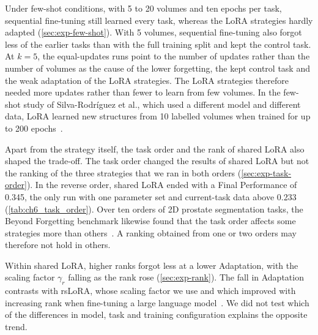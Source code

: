 Under few-shot conditions, with 5 to 20 volumes and ten epochs per task, sequential fine-tuning still learned every task, whereas the LoRA strategies hardly adapted (\cref{sec:exp-few-shot}).
With 5 volumes, sequential fine-tuning also forgot less of the earlier tasks than with the full training split and kept the control task.
At $k = 5$, the equal-updates runs point to the number of updates rather than the number of volumes as the cause of the lower forgetting, the kept control task and the weak adaptation of the LoRA strategies.
The LoRA strategies therefore needed more updates rather than fewer to learn from few volumes.
In the few-shot study of Silva-Rodríguez et al., which used a different model and different data, LoRA learned new structures from 10 labelled volumes when trained for up to 200 epochs~\cite[Sec.~4.3.2]{silvarodriguez2023fseft}.

Apart from the strategy itself, the task order and the rank of shared LoRA also shaped the trade-off.
The task order changed the results of shared LoRA but not the ranking of the three strategies that we ran in both orders (\cref{sec:exp-task-order}).
In the reverse order, shared LoRA ended with a Final Performance of 0.345, the only run with one parameter set and current-task data above 0.233 (\cref{tab:ch6_task_order}).
Over ten orders of 2D prostate segmentation tasks, the Beyond Forgetting benchmark likewise found that the task order affects some strategies more than others~\cite[Sec.~4.4]{wang2026beyondforgetting}.
A ranking obtained from one or two orders may therefore not hold in others.

Within shared LoRA, higher ranks forgot less at a lower Adaptation, with the scaling factor $\gamma_r$ falling as the rank rose (\cref{sec:exp-rank}).
The fall in Adaptation contrasts with rsLoRA, whose scaling factor we use and which improved with increasing rank when fine-tuning a large language model~\cite[Sec.~4]{kalajdzievski2023rankstabilizationscalingfactor}.
We did not test which of the differences in model, task and training configuration explains the opposite trend.

